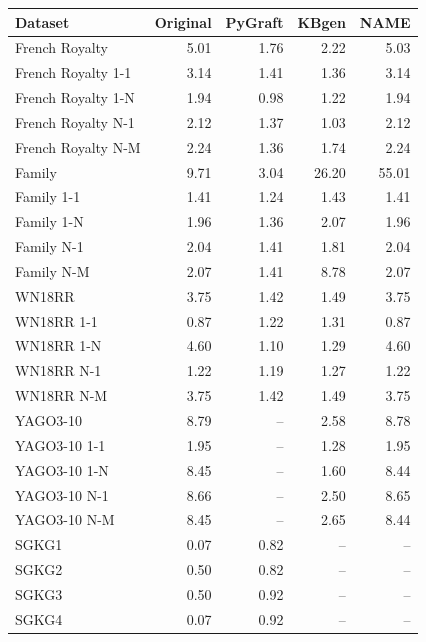 \begin{tabular}{lrrrr}
\toprule
Dataset & Original & PyGraft & KBgen & NAME \\
\midrule
French Royalty & 5.01 & 1.76 & 2.22 & 5.03 \\
French Royalty 1-1 & 3.14 & 1.41 & 1.36 & 3.14 \\
French Royalty 1-N & 1.94 & 0.98 & 1.22 & 1.94 \\
French Royalty N-1 & 2.12 & 1.37 & 1.03 & 2.12 \\
French Royalty N-M & 2.24 & 1.36 & 1.74 & 2.24 \\
\midrule
Family & 9.71 & 3.04 & 26.20 & 55.01 \\
Family 1-1 & 1.41 & 1.24 & 1.43 & 1.41 \\
Family 1-N & 1.96 & 1.36 & 2.07 & 1.96 \\
Family N-1 & 2.04 & 1.41 & 1.81 & 2.04 \\
Family N-M & 2.07 & 1.41 & 8.78 & 2.07 \\
\midrule
WN18RR & 3.75 & 1.42 & 1.49 & 3.75 \\
WN18RR 1-1 & 0.87 & 1.22 & 1.31 & 0.87 \\
WN18RR 1-N & 4.60 & 1.10 & 1.29 & 4.60 \\
WN18RR N-1 & 1.22 & 1.19 & 1.27 & 1.22 \\
WN18RR N-M & 3.75 & 1.42 & 1.49 & 3.75 \\
\midrule
YAGO3-10 & 8.79 & – & 2.58 & 8.78 \\
YAGO3-10 1-1 & 1.95 & – & 1.28 & 1.95 \\
YAGO3-10 1-N & 8.45 & – & 1.60 & 8.44 \\
YAGO3-10 N-1 & 8.66 & – & 2.50 & 8.65 \\
YAGO3-10 N-M & 8.45 & – & 2.65 & 8.44 \\
\midrule
SGKG1 & 0.07 & 0.82 & – & – \\
SGKG2 & 0.50 & 0.82 & – & – \\
SGKG3 & 0.50 & 0.92 & – & – \\
SGKG4 & 0.07 & 0.92 & – & – \\
\bottomrule
\end{tabular}
